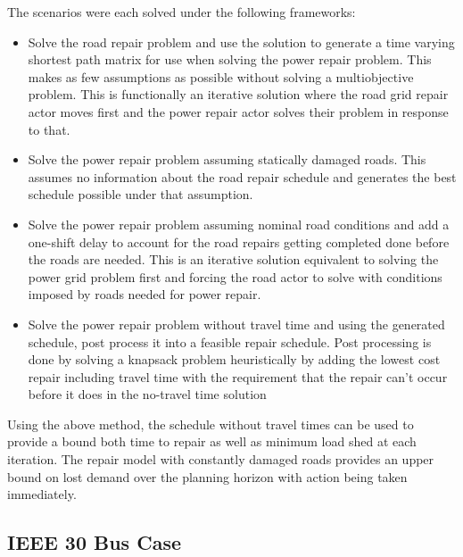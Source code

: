 \documentclass[10pt]{article}
\begin{document}
 The scenarios were each solved under the following frameworks:
 \vspace{-8pt}
 \begin{itemize}
 	\item Solve the road repair problem and use the solution to generate a time varying shortest path matrix for use when solving the power repair problem. This makes as few assumptions as possible without solving a multiobjective problem. This is functionally an iterative solution where the road grid repair actor moves first and the power repair actor solves their problem in response to that.
 	\item Solve the power repair problem assuming statically damaged roads. This assumes no information about the road repair schedule and generates the best schedule possible under that assumption.
 	\item Solve the power repair problem assuming nominal road conditions and add a one-shift delay to account for the road repairs getting completed done before the roads are needed. This is an iterative solution equivalent to solving the power grid problem first and forcing the road actor to solve with conditions imposed by roads needed for power repair.
 	\item Solve the power repair problem without travel time and using the generated schedule, post process it into a feasible repair schedule. Post processing is done by solving a knapsack problem heuristically by adding the lowest cost repair including travel time with the requirement that the repair can't occur before it does in the no-travel time solution
 \end{itemize}
\vspace{-8pt}
Using the above method, the schedule without travel times can be used to provide a bound both time to repair as well as minimum load shed at each iteration. The repair model with constantly damaged roads provides an upper bound on lost demand over the planning horizon with action being taken immediately.
\subsection{IEEE 30 Bus Case}
\end{document}
